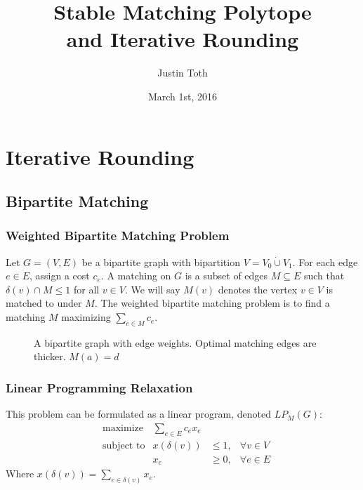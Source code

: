 \documentclass{beamer}
\author{Justin Toth}
\institute{University of Waterloo}
\date{March 1st, 2016}
\title{Stable Matching Polytope\\ and Iterative Rounding}
\begin{document}
\begin{frame}
\titlepage
\end{frame}

\section{Iterative Rounding}
\subsection{Bipartite Matching}

\begin{frame}
\frametitle{Weighted Bipartite Matching Problem}
Let $G=(V, E)$ be a bipartite graph with bipartition $V = V_0 \dot\cup V_1$. For each edge $e \in E$, assign a cost $c_e$. A matching on $G$ is a subset of edges $M \subseteq E$ such that $\delta(v) \cap M \leq 1$ for all $v \in V$. We will say $M(v)$ denotes the vertex $v \in V$ is matched to under $M$. The weighted bipartite matching problem is to find a matching $M$ maximizing $\sum_{e\in M} c_e$.

\begin{figure}
\centering
{}
\caption{A bipartite graph with edge weights. Optimal matching edges are thicker. $M(a) = d$}
\end{figure}
\end{frame}

\begin{frame}
\frametitle{Linear Programming Relaxation}
This problem can be formulated as a linear program, denoted $LP_M(G)$:
\begin{align*}
&\text{maximize} &\sum_{e \in E} c_e x_e \\
&\text{subject to} &x(\delta(v)) &\leq 1, &\forall v \in V\\
& &x_e &\geq 0, &\forall e \in E
\end{align*}
Where $x(\delta(v)) = \sum_{e \in \delta(v)} x_e$.
\end{frame}
\end{document}
